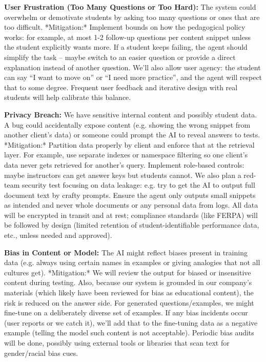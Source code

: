 \documentclass[11pt]{article}
\begin{document}
\textbf{User Frustration (Too Many Questions or Too Hard):} The system could overwhelm or demotivate students by asking too many questions or ones that are too difficult. *Mitigation:* Implement bounds on how the pedagogical policy works: for example, at most 1-2 follow-up questions per content snippet unless the student explicitly wants more. If a student keeps failing, the agent should simplify the task – maybe switch to an easier question or provide a direct explanation instead of another question. We’ll also allow user agency: the student can say “I want to move on” or “I need more practice”, and the agent will respect that to some degree. Frequent user feedback and iterative design with real students will help calibrate this balance.

\textbf{Privacy Breach:} We have sensitive internal content and possibly student data. A bug could accidentally expose content (e.g. showing the wrong snippet from another client’s data) or someone could prompt the AI to reveal answers to tests. *Mitigation:* Partition data properly by client and enforce that at the retrieval layer. For example, use separate indexes or namespace filtering so one client’s data never gets retrieved for another’s query. Implement role-based controls: maybe instructors can get answer keys but students cannot. We also plan a red-team security test focusing on data leakage: e.g. try to get the AI to output full document text by crafty prompts. Ensure the agent only outputs small snippets as intended and never whole documents or any personal data from logs. All data will be encrypted in transit and at rest; compliance standards (like FERPA) will be followed by design (limited retention of student-identifiable performance data, etc., unless needed and approved).

\textbf{Bias in Content or Model:} The AI might reflect biases present in training data (e.g. always using certain names in examples or giving analogies that not all cultures get). *Mitigation:* We will review the output for biased or insensitive content during testing. Also, because our system is grounded in our company’s materials (which likely have been reviewed for bias as educational content), the risk is reduced on the answer side. For generated questions/examples, we might fine-tune on a deliberately diverse set of examples. If any bias incidents occur (user reports or we catch it), we’ll add that to the fine-tuning data as a negative example (telling the model such content is not acceptable). Periodic bias audits will be done, possibly using external tools or libraries that scan text for gender/racial bias cues.
\end{document}
